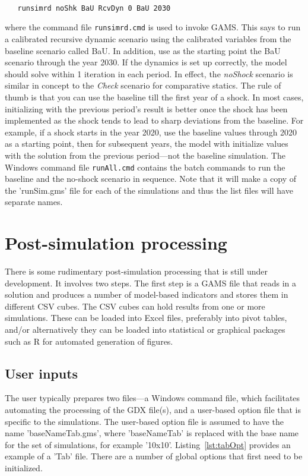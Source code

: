 \begin{verbatim}

   runsimrd noShk BaU RcvDyn 0 BaU 2030

\end{verbatim}

\noindent where the command file \texttt{runsimrd.cmd} is used to invoke
GAMS. This says to run a calibrated recursive dynamic scenario using the
calibrated variables from the baseline scenario called BaU. In addition,
use as the starting point the BaU scenario through the year 2030.
If the dynamics is set up correctly, the
model should solve within 1 iteration in each period. In effect, the
\emph{noShock} scenario is similar in concept to the \emph{Check} scenario for
comparative statics. The rule of thumb is that you can use the baseline till the
first year of a shock. In most cases, initializing with the previous period's
result is better once the shock has been implemented as the shock tends to lead
to sharp deviations from the baseline. For example, if a shock starts in the year 2020,
use the baseline values through 2020 as a starting point, then for subsequent
years, the model with initialize values with the solution from the previous
period---not the baseline simulation. The Windows command file \texttt{runAll.cmd}
contains the batch commands to run the baseline and the no-shock scenario
in sequence. Note that it will make a copy of the 'runSim.gms' file for each
of the simulations and thus the list files will have separate names.

\section{Post-simulation processing}

There is some rudimentary post-simulation processing that is still under development. It
involves two steps. The first step is a GAMS file that reads in a solution and produces
a number of model-based indicators and stores them in different CSV cubes. The CSV
cubes can hold results from one or more simulations. These can be loaded into
Excel files, preferably into pivot tables, and/or alternatively they can be loaded
into statistical or graphical packages such as R for automated generation of figures.

\subsection{User inputs}

The user typically prepares two files---a Windows command file, which facilitates
automating the processing of the GDX file(s), and a user-based option file that
is specific to the simulations. The user-based option file is assumed to have
the name 'baseNameTab.gms', where 'baseNameTab' is replaced with the base name
for the set of simulations, for example '10x10'. Listing~\ref{lst:tabOpt} provides
an example of a 'Tab' file. There are a number of global options that first need
to be initialized.

